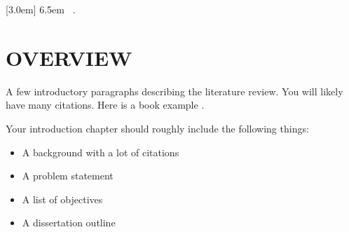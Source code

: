 

[3.0em]
{\hangindent6.5em}%
{\contentsmargin{0pt} 
    \chaptername\ \thecontentslabel.\enspace%
    \normalsize}
{\contentsmargin{0pt}\normalsize}
{\contentspage}

\chapter{OVERVIEW}\label{Introduction}
\renewcommand{\thechapter}{\arabic{chapter}}


A few introductory paragraphs describing the literature review. 
You will likely have many citations. Here is a book example \cite{book1}.

Your introduction chapter should roughly include the following things:

\begin{itemize}
\item{A background with a lot of citations}
\item{A problem statement}
\item{A list of objectives}
\item{A dissertation outline}
\end{itemize}

